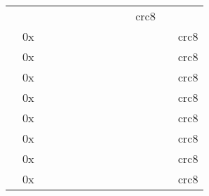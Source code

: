 \begin{landscape}
\begin{footnotesize}
\begin{tabular}{lllllllllllll}
     &
     &
     &
     &
     &
     &
     &
     &
     &
     &
    crc8 \\
 &
    0x &
     &
     &
     &
     &
     &
     &
     &
     &
     &
     &
    crc8 \\
 &
    0x &
     &
     &
     &
     &
     &
     &
     &
     &
     &
     &
    crc8 \\
 &
    0x &
     &
     &
     &
     &
     &
     &
     &
     &
     &
     &
    crc8 \\
 &
    0x &
     &
     &
     &
     &
     &
     &
     &
     &
     &
     &
    crc8 \\
 &
    0x &
     &
     &
     &
     &
     &
     &
     &
     &
     &
     &
    crc8 \\
 &
    0x &
     &
     &
     &
     &
     &
     &
     &
     &
     &
     &
    crc8 \\
 &
    0x &
     &
     &
     &
     &
     &
     &
     &
     &
     &
     &
    crc8 \\
 &
    0x &
     &
     &
     &
     &
     &
     &
     &
     &
     &
     &
    crc8 \\

\end{tabular}
\end{footnotesize}
\end{landscape}
